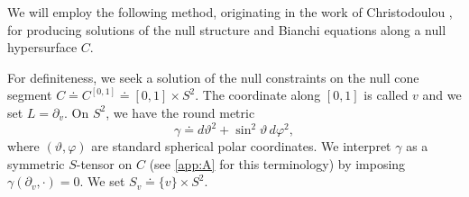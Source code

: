 \documentclass[10pt]{article}
\numberwithin{equation}{section}
\theoremstyle{plain}
\theoremstyle{definition}
\begin{document}
We will employ the following method, originating in the work of Christodoulou \cite{Christo09}, for producing solutions of the null structure and Bianchi equations along a null hypersurface $C$.  

For definiteness, we seek a solution of the null constraints on the null cone segment $C\doteq C^{[0,1]}\doteq [0,1]\times S^2$. The coordinate along $[0,1]$ is called $v$ and we set $L=\partial_v$. On $S^2$, we have the round metric
\begin{equation*}
    \gamma \doteq d\vartheta^2+\sin^2\vartheta\,d\varphi^2,
\end{equation*}
where $(\vartheta,\varphi)$ are standard spherical polar coordinates. We interpret $\gamma$ as a symmetric $S$-tensor on $C$ (see \cref{app:A} for this terminology) by imposing $\gamma(\partial_v,\cdot)=0$. We set $S_v\doteq \{v\}\times S^2$. 
\end{document}
